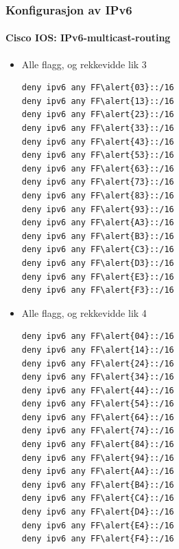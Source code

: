 \begin{frame}[fragile]%
  \frametitle{Konfigurasjon av IPv6}
  \framesubtitle{Cisco IOS: IPv6-multicast-routing}
  \begin{multicols}{2}
    \begin{itemize}%
    \item Alle flagg, og rekkevidde lik 3
\begin{Verbatim}[commandchars=\\\{\},fontsize=\scriptsize]
deny ipv6 any FF\alert{03}::/16
deny ipv6 any FF\alert{13}::/16
deny ipv6 any FF\alert{23}::/16
deny ipv6 any FF\alert{33}::/16
deny ipv6 any FF\alert{43}::/16
deny ipv6 any FF\alert{53}::/16
deny ipv6 any FF\alert{63}::/16
deny ipv6 any FF\alert{73}::/16
deny ipv6 any FF\alert{83}::/16
deny ipv6 any FF\alert{93}::/16
deny ipv6 any FF\alert{A3}::/16
deny ipv6 any FF\alert{B3}::/16
deny ipv6 any FF\alert{C3}::/16
deny ipv6 any FF\alert{D3}::/16
deny ipv6 any FF\alert{E3}::/16
deny ipv6 any FF\alert{F3}::/16
\end{Verbatim}
    \item Alle flagg, og rekkevidde lik 4
\begin{Verbatim}[commandchars=\\\{\},fontsize=\scriptsize]
deny ipv6 any FF\alert{04}::/16
deny ipv6 any FF\alert{14}::/16
deny ipv6 any FF\alert{24}::/16
deny ipv6 any FF\alert{34}::/16
deny ipv6 any FF\alert{44}::/16
deny ipv6 any FF\alert{54}::/16
deny ipv6 any FF\alert{64}::/16
deny ipv6 any FF\alert{74}::/16
deny ipv6 any FF\alert{84}::/16
deny ipv6 any FF\alert{94}::/16
deny ipv6 any FF\alert{A4}::/16
deny ipv6 any FF\alert{B4}::/16
deny ipv6 any FF\alert{C4}::/16
deny ipv6 any FF\alert{D4}::/16
deny ipv6 any FF\alert{E4}::/16
deny ipv6 any FF\alert{F4}::/16
\end{Verbatim}
    \end{itemize}
  \end{multicols}
\end{frame}

